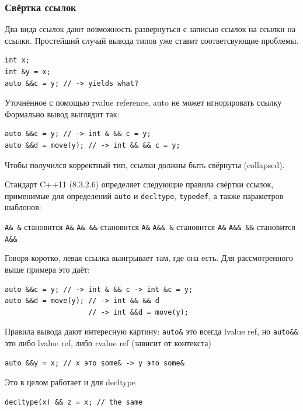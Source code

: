 \documentclass[a4paper,12pt,oneside]{article}
\begin{document}
\subsubsection{Свёртка ссылок}\label{ReferenceConvolution}

Два вида ссылок дают возможность развернуться с записью ссылок на ссылки на ссылки. Простейший случай вывода типов уже ставит соответсвующие проблемы.

\begin{lstlisting}
int x;
int &y = x;
auto &&c = y; // -> yields what?
\end{lstlisting}

Уточнённое с помощью rvalue reference, auto не может игнорировать ссылку
Формально вывод выглядит так:

\begin{lstlisting}
auto &&c = y; // -> int & && c = y;
auto &&d = move(y); // -> int && && c = y;
\end{lstlisting}

Чтобы получился корректный тип, ссылки должны быть свёрнуты (collapsed).

Стандарт C++11 (8.3.2.6) определяет следующие правила свёртки ссылок, применимые для определений \lstinline!auto! и \lstinline!decltype!, \lstinline!typedef!, а также параметров шаблонов:

\lstinline!A& &! становится \lstinline!A&!
\lstinline!A& &&! становится \lstinline!A&!
\lstinline!A&& &! становится \lstinline!A&!
\lstinline!A&& &&! становится \lstinline!A&&!

Говоря коротко, левая ссылка выигрывает там, где она есть. Для рассмотренного выше примера это даёт:

\begin{lstlisting}
auto &&c = y; // -> int & && c -> int &c = y;
auto &&d = move(y); // -> int && && d 
                    // -> int &&d = move(y);
\end{lstlisting}

Правила вывода дают интересную картину: \lstinline!auto&! это всегда lvalue ref, но \lstinline!auto&&! это либо lvalue ref, либо rvalue ref (зависит от контекста)

\begin{lstlisting}
auto &&y = x; // x это some& -> y это some&
\end{lstlisting}

Это в целом работает и для decltype

\begin{lstlisting}
decltype(x) && z = x; // the same
\end{lstlisting}
\end{document}
